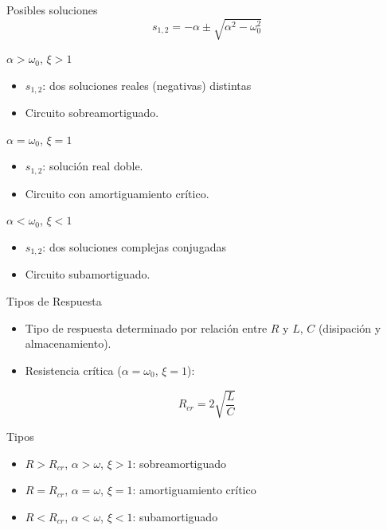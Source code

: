 \documentclass[xcolor={usenames,svgnames,dvipsnames}]{beamer}
\begin{document}
\begin{frame}[label={sec:org4558d9c}]{Posibles soluciones}
\[
  \boxed{s_{1,2} = -\alpha \pm \sqrt{\alpha^2 - \omega_0^2}}
\]

\begin{block}{\(\alpha > \omega_0\), \(\xi > 1\)}
\begin{itemize}
\item \(s_{1,2}\): dos soluciones reales (negativas) distintas
\item Circuito \alert{sobreamortiguado}.
\end{itemize}
\end{block}

\begin{block}{\(\alpha = \omega_0\), \(\xi = 1\)}
\begin{itemize}
\item \(s_{1,2}\): solución real doble.
\item Circuito con \alert{amortiguamiento crítico}.
\end{itemize}
\end{block}

\begin{block}{\(\alpha < \omega_0\), \(\xi < 1\)}
\begin{itemize}
\item \(s_{1,2}\): dos soluciones complejas conjugadas
\item Circuito \alert{subamortiguado}.
\end{itemize}
\end{block}
\end{frame}

\begin{frame}[label={sec:orge8200d4}]{Tipos de Respuesta}
\begin{itemize}
\item Tipo de respuesta determinado por relación entre \(R\) y \(L\), \(C\) (disipación y almacenamiento).
\item Resistencia crítica (\(\alpha = \omega_0\), \(\xi = 1\)):
\end{itemize}

\[
  R_{cr} = 2\sqrt{\frac{L}{C}}
\]

\begin{block}{Tipos}
\begin{itemize}
\item \(R > R_{cr}\), \(\alpha > \omega\), \(\xi > 1\): \alert{sobreamortiguado}
\item \(R = R_{cr}\),  \(\alpha = \omega\), \(\xi = 1\): \alert{amortiguamiento crítico}
\item \(R < R_{cr}\),  \(\alpha < \omega\), \(\xi < 1\): \alert{subamortiguado}
\end{itemize}
\end{block}
\end{frame}
\end{document}
